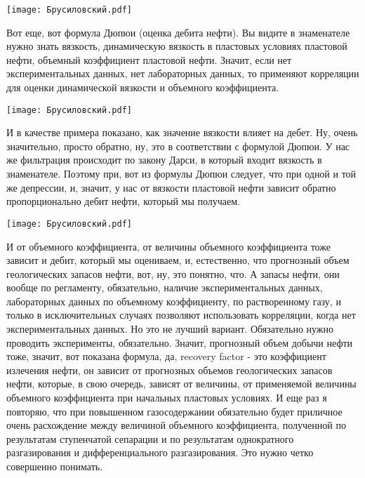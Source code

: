 \documentclass[main.tex]{subfiles}
\begin{document}
\begin{center}
\texttt{[image: Брусиловский.pdf]}
\end{center}

Вот еще, вот формула Дюпюи (оценка дебита нефти).
Вы видите в знаменателе нужно знать вязкость, динамическую вязкость в пластовых условиях пластовой нефти, объемный коэффициент пластовой нефти.
Значит, если нет экспериментальных данных, нет лабораторных данных, то применяют корреляции для оценки динамической вязкости и объемного коэффициента.

\begin{center}
\texttt{[image: Брусиловский.pdf]}
\end{center}

И в качестве примера показано, как значение вязкости влияет на дебет.
Ну, очень значительно, просто обратно, ну, это в соответствии с формулой Дюпюи.
У нас же фильтрация происходит по закону Дарси, в который входит вязкость в знаменателе.
Поэтому при, вот из формулы Дюпюи следует, что при одной и той же депрессии, и, значит, у нас от вязкости пластовой нефти зависит обратно пропорционально дебит нефти, который мы получаем.

\begin{center}
\texttt{[image: Брусиловский.pdf]}
\end{center}

И от объемного коэффициента, от величины объемного коэффициента тоже зависит и дебит, который мы оцениваем, и, естественно, что прогнозный объем геологических запасов нефти, вот, ну, это понятно, что.
А запасы нефти, они вообще по регламенту, обязательно, наличие экспериментальных данных, лабораторных данных по объемному коэффициенту, по растворенному газу, и только в исключительных случаях позволяют использовать корреляции, когда нет экспериментальных данных.
Но это не лучший вариант.
Обязательно нужно проводить эксперименты, обязательно.
Значит, прогнозный объем добычи нефти тоже, значит, вот показана формула, да, recovery factor - это коэффициент излечения нефти, он зависит от прогнозных объемов геологических запасов нефти,
которые, в свою очередь, зависят от величины, от применяемой величины объемного коэффициента при начальных пластовых условиях.
И еще раз я повторяю, что при повышенном газосодержании обязательно будет приличное очень расхождение между величиной объемного коэффициента, полученной по результатам ступенчатой сепарации и по результатам однократного разгазирования и дифференциального разгазирования.
Это нужно четко совершенно понимать.
\end{document}
